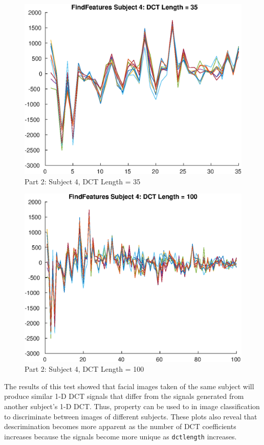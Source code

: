 \documentclass[conference]{IEEEtran}
\begin{document}
  \begin{figure}[H]
    \centering
    \includegraphics[scale=0.5]{./img/part_2_s_4_dct_35.eps}
    \caption{Part 2: Subject 4, DCT Length = 35}
    \label{fig:part_2_s_4_dct_35}
  \end{figure}

  \begin{figure}[H]
    \centering
    \includegraphics[scale=0.5]{./img/part_2_s_4_dct_100.eps}
    \caption{Part 2: Subject 4, DCT Length = 100}
    \label{fig:part_2_s_4_dct_100}
  \end{figure}

  The results of this test showed that facial images taken of the same subject
  will produce similar 1-D DCT signals that differ from the signals generated
  from another subject's 1-D DCT. Thus, property can be used to in image
  classification to discriminate between images of different subjects. These
  plots also reveal that descrimination becomes more apparent as the number of
  DCT coefficients increases because the signals become more unique as
  \texttt{dctlength} increases.
\end{document}
